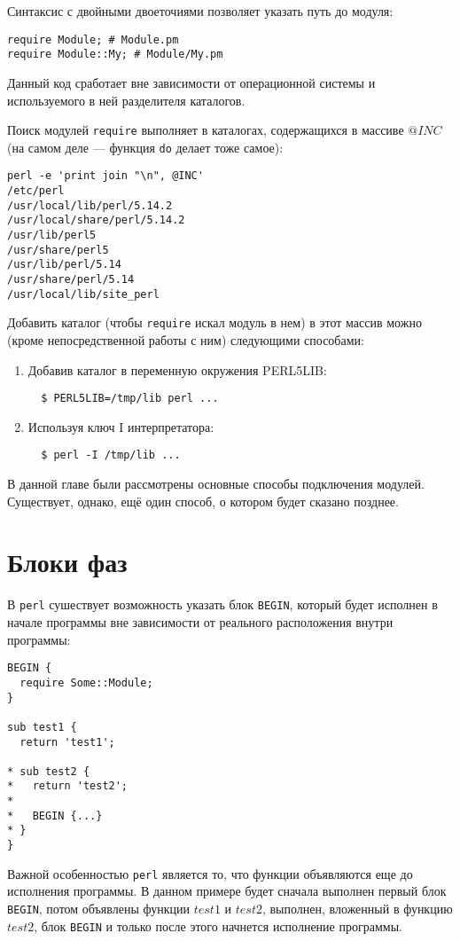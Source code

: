 Синтаксис с двойными двоеточиями позволяет указать путь до модуля:
\begin{verbatim}
require Module; # Module.pm
require Module::My; # Module/My.pm
\end{verbatim}
Данный код сработает вне зависимости от операционной системы и используемого в ней разделителя каталогов.

Поиск модулей \verb|require| выполняет в каталогах, содержащихся в массиве $@INC$ (на самом деле --- функция \verb|do| делает тоже самое):
\begin{verbatim}
perl -e 'print join "\n", @INC'
/etc/perl
/usr/local/lib/perl/5.14.2
/usr/local/share/perl/5.14.2
/usr/lib/perl5
/usr/share/perl5
/usr/lib/perl/5.14
/usr/share/perl/5.14
/usr/local/lib/site_perl
\end{verbatim}
Добавить каталог (чтобы \verb|require| искал модуль в нем) в этот массив можно (кроме непосредственной работы с ним) следующими способами:
\begin{enumerate}
	\item Добавив каталог в переменную окружения PERL5LIB:
  \begin{verbatim}
  $ PERL5LIB=/tmp/lib perl ...
  \end{verbatim}
	\item Используя ключ I интерпретатора:
  \begin{verbatim}
  $ perl -I /tmp/lib ...
  \end{verbatim}
\end{enumerate}
В данной главе были рассмотрены основные способы подключения модулей. Существует, однако, ещё один способ, о котором будет сказано позднее.

\section{Блоки фаз} %
В \verb|perl| сушествует возможность указать блок \verb|BEGIN|, который будет исполнен в начале программы вне зависимости от реального расположения внутри программы:
\begin{verbatim}
BEGIN {
  require Some::Module;
}

sub test1 {
  return 'test1';

* sub test2 {
*   return 'test2';
*
*   BEGIN {...}
* }
}
\end{verbatim}
Важной особенностью \verb|perl| является то, что функции объявляются еще до исполнения программы. В данном примере будет сначала выполнен первый блок \verb|BEGIN|, потом объявлены функции $test1$ и $test2$, выполнен, вложенный в функцию $test2$, блок \verb|BEGIN| и только после этого начнется исполнение программы.

